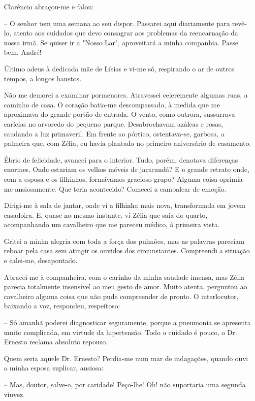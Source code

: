 \documentclass[portuguese,12pt,a4paper]{scrbook}
\begin{document}
	Clarêncio abraçou-me e falou:
	
	– O senhor tem uma semana ao seu dispor. Passarei aqui diariamente para revê-lo, atento aos cuidados que devo consagrar aos problemas da reencarnação da nossa irmã. Se quiser ir a "Nosso Lar", aproveitará a minha companhia. Passe bem, André!
	
	Último adeus à dedicada mãe de Lísias e vi-me só, respirando o ar de outros tempos, a longos haustos.
	
	Não me demorei a examinar pormenores. Atravessei celeremente algumas ruas, a caminho de casa. O coração batia-me descompassado, à medida que me aproximava do grande portão de entrada. O vento, como outrora, sussurrava carícias no arvoredo do pequeno parque. Desabrochavam azáleas e rosas, saudando a luz primaveril. Em frente ao pórtico, ostentava-se, garbosa, a palmeira que, com Zélia, eu havia plantado no primeiro aniversário de casamento.
	
	Ébrio de felicidade, avancei para o interior. Tudo, porém, denotava diferenças enormes. Onde estariam os velhos móveis de jacarandá? E o grande retrato onde, com a esposa e os filhinhos, formávamos gracioso grupo? Alguma coisa oprimia-me ansiosamente. Que teria acontecido? Comecei a cambalear de emoção.
	
	Dirigi-me à sala de jantar, onde vi a filhinha mais nova, transformada em jovem casadoira. E, quase no mesmo instante, vi Zélia que saía do quarto, acompanhando um cavalheiro que me pareceu médico, à primeira vista.
	
	Gritei a minha alegria com toda a força dos pulmões, mas as palavras pareciam reboar pela casa sem atingir os ouvidos dos circunstantes. Compreendi a situação e calei-me, desapontado.
	
	Abracei-me à companheira, com o carinho da minha saudade imensa, mas Zélia parecia totalmente insensível ao meu gesto de amor. Muito atenta, perguntou ao cavalheiro alguma coisa que não pude compreender de pronto. O interlocutor, baixando a voz, respondeu, respeitoso:
	
	– Só amanhã poderei diagnosticar seguramente, porque a pneumonia se apresenta muito complicada, em virtude da hipertensão. Todo o cuidado é pouco, o Dr. Ernesto reclama absoluto repouso.
	
	Quem seria aquele Dr. Ernesto? Perdia-me num mar de indagações, quando ouvi a minha esposa suplicar, ansiosa:
	
	– Mas, doutor, salve-o, por caridade! Peço-lhe! Oh! não suportaria uma segunda viuvez.
	
\end{document}
